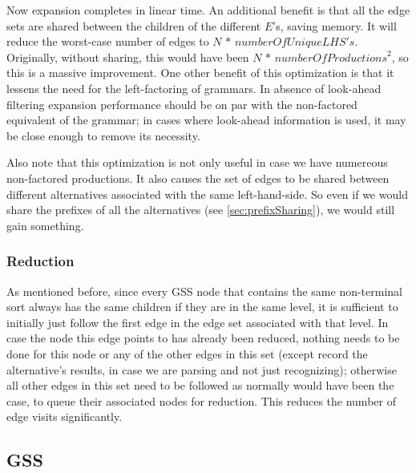 \documentclass[a4paper,10pt]{article}
\begin{document}
Now expansion completes in linear time. An additional benefit is that all the edge sets are shared between the children of the different $E$'s, saving memory. It will reduce the worst-case number of edges to $N\,*\,\mathit{numberOfUniqueLHS's}$. Originally, without sharing, this would have been $N\,*\,\mathit{numberOfProductions}^2$, so this is a massive improvement. One other benefit of this optimization is that it lessens the need for the left-factoring of grammars. In absence of look-ahead filtering expansion performance should be on par with the non-factored equivalent of the grammar; in cases where look-ahead information is used, it may be close enough to remove its necessity.

Also note that this optimization is not only useful in case we have numereous non-factored productions. It also causes the set of edges to be shared between different alternatives associated with the same left-hand-side. So even if we would share the prefixes of all the alternatives (see \ref{sec:prefixSharing}), we would still gain something.

\subsubsection{Reduction}
\label{subsec:edgeVisitOptimization}
As mentioned before, since every GSS node that contains the same non-terminal sort always has the same children if they are in the same level, it is sufficient to initially just follow the first edge in the edge set associated with that level. In case the node this edge points to has already been reduced, nothing needs to be done for this node or any of the other edges in this set (except record the alternative's results, in case we are parsing and not just recognizing); otherwise all other edges in this set need to be followed as normally would have been the case, to queue their associated nodes for reduction. This reduces the number of edge visits significantly.

\subsection{GSS}
\end{document}

